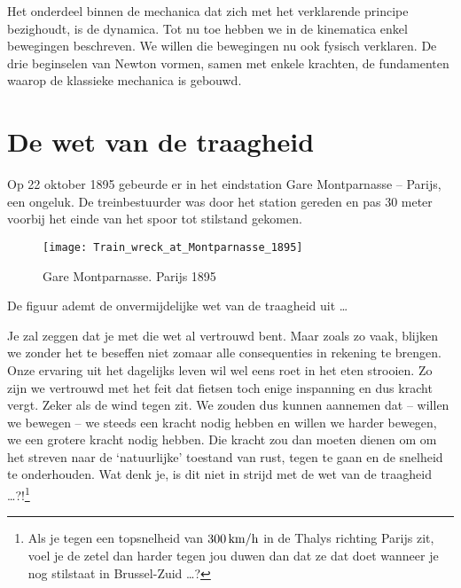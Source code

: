\documentclass{ximera}
\begin{document}
	\author{Bart Lambregs}
    \xmsource


	Het onderdeel binnen de mechanica dat zich met het verklarende principe bezighoudt, is de dynamica. Tot nu toe hebben we in de kinematica enkel bewegingen beschreven. We willen die bewegingen nu ook fysisch verklaren. De drie beginselen van Newton vormen, samen met enkele krachten, de fundamenten waarop de klassieke mechanica is gebouwd. 

	
	

	
	\section{De wet van de traagheid}
	
	Op 22 oktober 1895 gebeurde er in het eindstation Gare Montparnasse -- Parijs, een ongeluk. De treinbestuurder was door het station gereden en pas 30 meter voorbij het einde van het spoor tot stilstand gekomen.
	\begin{figure}[h]
	\begin{center}
	\texttt{[image: Train\_wreck\_at\_Montparnasse\_1895]}
	\caption{Gare Montparnasse. Parijs 1895}
	\end{center}
	\end{figure}
	
	De figuur ademt de onvermijdelijke wet van de traagheid uit \ldots
	
	Je zal zeggen dat je met die wet al vertrouwd bent. Maar zoals zo vaak, blijken we zonder het te beseffen niet zomaar alle consequenties in rekening te brengen. Onze ervaring uit het dagelijks leven
	wil wel eens roet in het eten strooien. Zo zijn we vertrouwd met het feit dat
	fietsen toch enige inspanning en dus kracht vergt. Zeker als de wind tegen zit.
	We zouden dus kunnen aannemen dat -- willen we bewegen -- we steeds een kracht nodig
	hebben en willen we harder bewegen, we een grotere kracht nodig hebben. Die kracht zou dan moeten dienen om om het streven naar de `natuurlijke' toestand van rust, tegen te gaan en de snelheid te onderhouden. Wat denk je, is dit niet in strijd met de wet van de traagheid \ldots?!\footnote{Als je tegen een topsnelheid van $300\rm\,km/h$ in de Thalys richting Parijs zit, voel je de zetel dan harder tegen jou duwen dan dat ze dat doet wanneer je nog stilstaat in Brussel-Zuid \ldots?}
	
\end{document}
